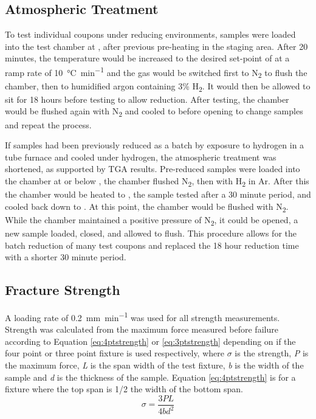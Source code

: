     \subsection{Atmospheric Treatment}
        To test individual coupons under reducing environments, samples were loaded into the test chamber at , after previous pre-heating in the staging area.
        After 20 minutes, the temperature would be increased to the desired set-point of  at a ramp rate of \SI{10}{\celsius\per\minute} and the gas would be switched first to N\textsubscript{2} to flush the chamber, then to humidified argon containing 3\% H\textsubscript{2}.
        It would then be allowed to sit for 18 hours before testing to allow reduction.
        After testing, the chamber would be flushed again with N\textsubscript{2} and cooled to  before opening to change samples and repeat the process.

        If samples had been previously reduced as a batch by exposure to hydrogen in a tube furnace and cooled under hydrogen, the atmospheric treatment was shortened, as supported by TGA results.
        Pre-reduced samples were loaded into the chamber at or below , the chamber flushed N\textsubscript{2}, then with H\textsubscript{2} in Ar.
        After this the chamber would be heated to , the sample tested after a 30
        minute period, and cooled back down to .
        At this point, the chamber would be flushed with N\textsubscript{2}.
        While the chamber maintained a positive pressure of N\textsubscript{2}, it could be opened, a new sample loaded, closed, and allowed to flush.
        This procedure allows for the batch reduction of many test coupons and replaced the 18 hour reduction time with a shorter 30 minute period.

    \subsection{Fracture Strength}
        A loading rate of \SI{0.2}{mm\per\minute} was used for all strength measurements.
        Strength was calculated from the maximum force measured before failure according to Equation \ref{eq:4ptstrength} or \ref{eq:3ptstrength} depending on if the four point or three point fixture is used respectively, where $\sigma{}$ is the strength, \textit{P} is the maximum force, \textit{L} is the span width of the test fixture, \textit{b} is the width of the sample and \textit{d} is the thickness of the sample. Equation \ref{eq:4ptstrength} is for a fixture where the top span is 1/2 the width of the bottom span.\cite{ASTM2008}
        \begin{equation}
            \sigma = \frac{3PL}{4bd^{2}}
            \label{eq:4ptstrength}
        \end{equation}


